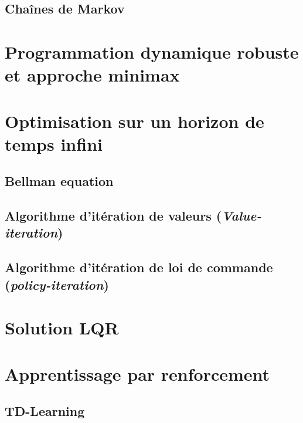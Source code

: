 \subsection{Chaînes de Markov}



\section{Programmation dynamique robuste et approche minimax}




\section{Optimisation sur un horizon de temps infini}

\subsection{Bellman equation}


\subsection{Algorithme d'itération de valeurs (\textit{Value-iteration})}

\subsection{Algorithme d'itération de loi de commande (\textit{policy-iteration})}


\section{Solution LQR}


\section{Apprentissage par renforcement}


\subsection{TD-Learning}

